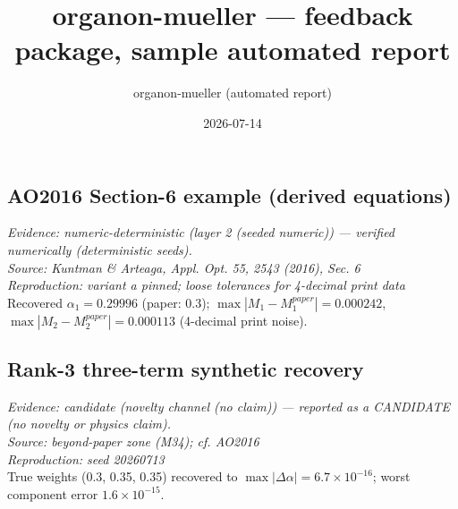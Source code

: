 \documentclass[11pt]{article}
\title{organon-mueller --- feedback package, sample automated report}
\date{2026-07-14}
\author{organon-mueller (automated report)}
\begin{document}
\maketitle
\subsection*{AO2016 Section-6 example (derived equations)}
\textit{Evidence: numeric-deterministic (layer 2 (seeded numeric)) --- verified numerically (deterministic seeds).}\\
\textit{Source: Kuntman \& Arteaga, Appl. Opt. 55, 2543 (2016), Sec. 6}\\
\textit{Reproduction: variant a pinned; loose tolerances for 4-decimal print data}\\
Recovered $\alpha_1 = 0.29996$ (paper: 0.3); $\max|M_1 - M_1^{paper}| = 0.000242$, $\max|M_2 - M_2^{paper}| = 0.000113$ (4-decimal print noise).
\subsection*{Rank-3 three-term synthetic recovery}
\textit{Evidence: candidate (novelty channel (no claim)) --- reported as a CANDIDATE (no novelty or physics claim).}\\
\textit{Source: beyond-paper zone (M34); cf. AO2016}\\
\textit{Reproduction: seed 20260713}\\
True weights (0.3, 0.35, 0.35) recovered to $\max|\Delta\alpha| = \ensuremath{6.7 \times 10^{-16}}$; worst component error $\ensuremath{1.6 \times 10^{-15}}$.
\end{document}
